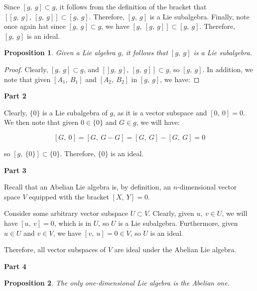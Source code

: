 \documentclass[10pt, oneside]{article}
\newtheorem{prop}{Proposition}
\begin{document}
    Since $[g, \ g] \subset g$, it follows from the definition of the bracket that $[[g, \ g], \ [g, \ g]] \subset [g, \ g]$. Therefore, $[g, \ g]$ is a Lie subalgebra. Finally,
    note once again hat since $[g, \ g] \subset g$, we have $[g, \ [g, \ g]] \subset [g, \ g]$. Therefore, $[g, \ g]$ is an ideal.

    \begin{prop}
      Given a Lie algebra $g$, it follows that $[g, \ g]$ is a Lie subalgebra.
    \end{prop}

    \begin{proof}
      Clearly, $[g, \ g] \subset g$, and $[[g, \ g], \ [g, \ g]] \subset g$, so $[g, \ g]$. In addition, we note that given $[A_1, \ B_1]$ and
      $[A_2, \ B_2]$ in $[g, \ g]$, we have:

      \end{proof}

    \textbf{Part 2}
    \newline

    Clearly, $\{0\}$ is a Lie subalgebra of $g$, as it is a vector subspace and $[0, \ 0] = 0$. We then note that given $0 \in \{0\}$ and $G \in g$, we will have:

    $$[G, \ 0] = [G, \ G - G] = [G, \ G] - [G, \ G] = 0$$

    so $[g, \ \{0\}] \subset \{0\}$. Therefore, $\{0\}$ is an ideal.
    \newline

    \textbf{Part 3}
    \newline

    Recall that an Abelian Lie algebra is, by definition, an $n$-dimensional vector space $V$ equipped with the bracket $[X, \ Y] = 0$.
    \newline

    Consider some arbitrary vector subspace $U \subset V$. Clearly, given $u, \ v \in U$, we will have $[u, \ v] = 0$, which is in $U$, so
    $U$ is a Lie subalgebra. Furthermore, given $u \in U$ and $v \in V$, we have $[v, \ u] = 0 \in V$, so $U$ is an ideal.
    \newline

    Therefore, all vector subspaces of $V$ are ideal under the Abelian Lie algebra.
    \newline

    \textbf{Part 4}
    \newline

    \begin{prop}
      The only one-dimensional Lie algebra is the Abelian one.
    \end{prop}
\end{document}
